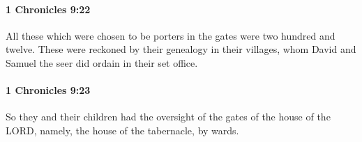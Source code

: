 		\paragraph{1 Chronicles 9:22} %
			\label{1CHRONICLES-9-22}

			All these which were chosen to be porters in the gates were two hundred and twelve. These were reckoned by their genealogy in their villages, whom David and Samuel the seer did ordain in their set office.


		\paragraph{1 Chronicles 9:23} %
			\label{1CHRONICLES-9-23}

			So they and their children had the oversight of the gates of the house of the LORD, namely, the house of the tabernacle, by wards.


